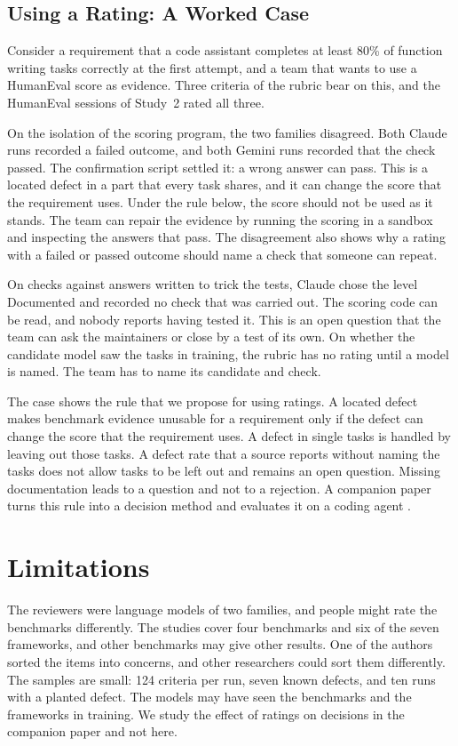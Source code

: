 \documentclass[runningheads]{llncs}
\begin{document}
\subsection{Using a Rating: A Worked Case}
Consider a requirement that a code assistant completes at least 80\% of function writing tasks correctly at the first attempt, and a team that wants to use a HumanEval score as evidence. Three criteria of the rubric bear on this, and the HumanEval sessions of Study~2 rated all three.

On the isolation of the scoring program, the two families disagreed. Both Claude runs recorded a failed outcome, and both Gemini runs recorded that the check passed. The confirmation script settled it: a wrong answer can pass. This is a located defect in a part that every task shares, and it can change the score that the requirement uses. Under the rule below, the score should not be used as it stands. The team can repair the evidence by running the scoring in a sandbox and inspecting the answers that pass. The disagreement also shows why a rating with a failed or passed outcome should name a check that someone can repeat.

On checks against answers written to trick the tests, Claude chose the level Documented and recorded no check that was carried out. The scoring code can be read, and nobody reports having tested it. This is an open question that the team can ask the maintainers or close by a test of its own. On whether the candidate model saw the tasks in training, the rubric has no rating until a model is named. The team has to name its candidate and check.

The case shows the rule that we propose for using ratings. A located defect makes benchmark evidence unusable for a requirement only if the defect can change the score that the requirement uses. A defect in single tasks is handled by leaving out those tasks. A defect rate that a source reports without naming the tasks does not allow tasks to be left out and remains an open question. Missing documentation leads to a question and not to a rejection. A companion paper turns this rule into a decision method and evaluates it on a coding agent \cite{anonymous_companion_method_2027}.

\section{Limitations}
\label{sec:threats}
The reviewers were language models of two families, and people might rate the benchmarks differently. The studies cover four benchmarks and six of the seven frameworks, and other benchmarks may give other results. One of the authors sorted the items into concerns, and other researchers could sort them differently. The samples are small: 124 criteria per run, seven known defects, and ten runs with a planted defect. The models may have seen the benchmarks and the frameworks in training. We study the effect of ratings on decisions in the companion paper \cite{anonymous_companion_method_2027} and not here.
\end{document}
